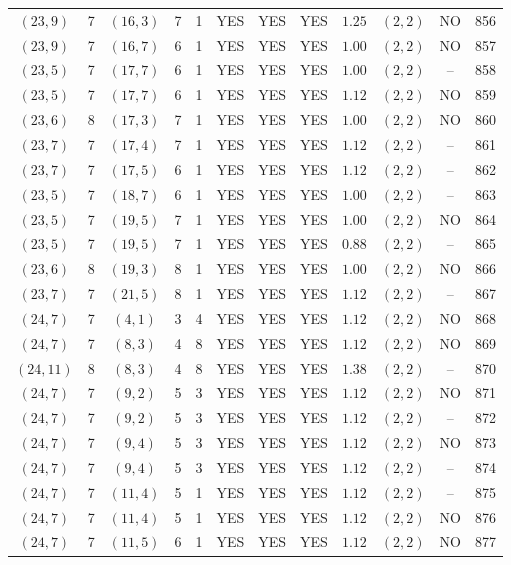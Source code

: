 \begin{longtable}{|c|c|c|c|c|c|c|c|c|c|c|c|}
$(23,9)$ & 7 & $(16,3)$ & 7 & 1 & YES & YES & YES & $1.25$ & $(2,2)$ & NO & 856\\
$(23,9)$ & 7 & $(16,7)$ & 6 & 1 & YES & YES & YES & $1.00$ & $(2,2)$ & NO & 857\\
$(23,5)$ & 7 & $(17,7)$ & 6 & 1 & YES & YES & YES & $1.00$ & $(2,2)$ & -- & 858\\
$(23,5)$ & 7 & $(17,7)$ & 6 & 1 & YES & YES & YES & $1.12$ & $(2,2)$ & NO & 859\\
$(23,6)$ & 8 & $(17,3)$ & 7 & 1 & YES & YES & YES & $1.00$ & $(2,2)$ & NO & 860\\
$(23,7)$ & 7 & $(17,4)$ & 7 & 1 & YES & YES & YES & $1.12$ & $(2,2)$ & -- & 861\\
$(23,7)$ & 7 & $(17,5)$ & 6 & 1 & YES & YES & YES & $1.12$ & $(2,2)$ & -- & 862\\
$(23,5)$ & 7 & $(18,7)$ & 6 & 1 & YES & YES & YES & $1.00$ & $(2,2)$ & -- & 863\\
$(23,5)$ & 7 & $(19,5)$ & 7 & 1 & YES & YES & YES & $1.00$ & $(2,2)$ & NO & 864\\
$(23,5)$ & 7 & $(19,5)$ & 7 & 1 & YES & YES & YES & $0.88$ & $(2,2)$ & -- & 865\\
$(23,6)$ & 8 & $(19,3)$ & 8 & 1 & YES & YES & YES & $1.00$ & $(2,2)$ & NO & 866\\
$(23,7)$ & 7 & $(21,5)$ & 8 & 1 & YES & YES & YES & $1.12$ & $(2,2)$ & -- & 867\\
$(24,7)$ & 7 & $(4,1)$ & 3 & 4 & YES & YES & YES & $1.12$ & $(2,2)$ & NO & 868\\
$(24,7)$ & 7 & $(8,3)$ & 4 & 8 & YES & YES & YES & $1.12$ & $(2,2)$ & NO & 869\\
$(24,11)$ & 8 & $(8,3)$ & 4 & 8 & YES & YES & YES & $1.38$ & $(2,2)$ & -- & 870\\
$(24,7)$ & 7 & $(9,2)$ & 5 & 3 & YES & YES & YES & $1.12$ & $(2,2)$ & NO & 871\\
$(24,7)$ & 7 & $(9,2)$ & 5 & 3 & YES & YES & YES & $1.12$ & $(2,2)$ & -- & 872\\
$(24,7)$ & 7 & $(9,4)$ & 5 & 3 & YES & YES & YES & $1.12$ & $(2,2)$ & NO & 873\\
$(24,7)$ & 7 & $(9,4)$ & 5 & 3 & YES & YES & YES & $1.12$ & $(2,2)$ & -- & 874\\
$(24,7)$ & 7 & $(11,4)$ & 5 & 1 & YES & YES & YES & $1.12$ & $(2,2)$ & -- & 875\\
$(24,7)$ & 7 & $(11,4)$ & 5 & 1 & YES & YES & YES & $1.12$ & $(2,2)$ & NO & 876\\
$(24,7)$ & 7 & $(11,5)$ & 6 & 1 & YES & YES & YES & $1.12$ & $(2,2)$ & NO & 877\\

\end{longtable}

